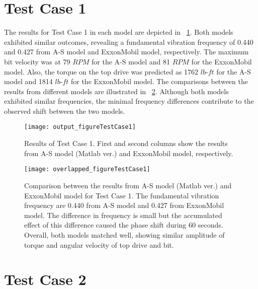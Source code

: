 \section{Test Case 1}
The results for Test Case 1 in each model are depicted in \figurename~\ref{figure_testcase1}. Both models exhibited similar outcomes, revealing a fundamental vibration frequency of 0.440 and 0.427 from A-S model and ExxonMobil model, respectively. The maximum bit velocity was at 79 $RPM$ for the A-S model and 81 $RPM$ for the ExxonMobil model. Also, the torque on the top drive was predicted as 1762 $lb\mbox{-}ft$ for the A-S model and 1814 $lb\mbox{-}ft$ for the ExxonMobil model. The comparisons between the results from different models are illustrated in \figurename~\ref{figure_testcase1_overlapped}. Although both models exhibited similar frequencies, the minimal frequency differences contribute to the observed shift between the two models.
\begin{figure}[!hbt]
  \centering
  \texttt{[image: output\_figureTestCase1]}
  \caption[Results of Test Case 1]{Results of Test Case 1. First and second columns show the results from A-S model (Matlab ver.) and ExxonMobil model, respectively.}\label{figure_testcase1}
\end{figure}
\begin{figure}
  \centering
  \texttt{[image: overlapped\_figureTestCase1]}
  \caption[Comparison of the results for Test Case 1]{Comparison between the results from A-S model (Matlab ver.) and ExxonMobil model for Test Case 1. The fundamental vibration frequency are 0.440 from A-S model and 0.427 from ExxonMobil model. The difference in frequency is small but the accumulated effect of this difference caused the phase shift during 60 seconds. Overall, both models matched well, showing similar amplitude of torque and angular velocity of top drive and bit.}\label{figure_testcase1_overlapped}
\end{figure}

\section{Test Case 2}
